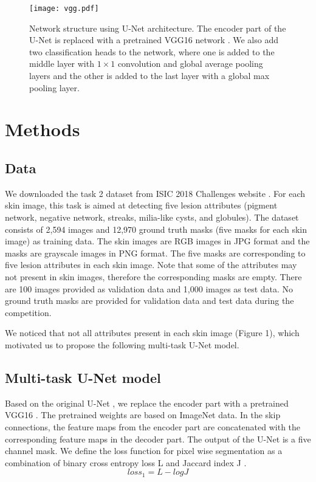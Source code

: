 \documentclass{article}
\begin{document}
\begin{figure}[!ht]
\begin{center}
\texttt{[image: vgg.pdf]}
\end{center}
   \caption{Network structure using U-Net architecture. The encoder part of the U-Net is replaced with a pretrained VGG16 network \cite{shvets2018automatic}. We also add two classification heads to the network, where one is added to the middle layer with $1\times1$ convolution and global average pooling layers and the other is added to the last layer with a global max pooling layer.}
\label{fig:short}
\end{figure}


\section{Methods}


\subsection{Data}
We downloaded the task 2 dataset from ISIC 2018 Challenges website \cite{Tschandl2018_HAM10000}. For each skin image, this task is aimed at detecting five lesion attributes (pigment network, negative network, streaks, milia-like cysts, and globules). The dataset consists of 2,594 images and 12,970 ground truth masks (five masks for each skin image) as training data. The skin images are RGB images in JPG format and the masks are grayscale images in PNG format. The five masks are corresponding to five lesion attributes in each skin image. Note that some of the attributes may not present in skin images, therefore the corresponding masks are empty. There are 100 images provided as validation data and 1,000 images as test data.  No ground truth masks are provided for validation data and test data during the competition. 

We noticed that not all attributes present in each skin image (Figure 1), which motivated us to propose the following multi-task U-Net model.

\subsection{Multi-task U-Net model}
Based on the original U-Net \cite{ronneberger2015u}, we replace the encoder part with a pretrained VGG16 \cite{iglovikov2018ternausnetv2}. The pretrained weights are based on ImageNet data. In the skip connections, the feature maps from the encoder part are concatenated with the corresponding feature maps in the decoder part. The output of the U-Net is a five channel mask. We define the loss function for pixel wise segmentation as a combination of binary cross entropy loss L and Jaccard index J \cite{shvets2018automatic}. 
\begin{equation}
loss_1 = L - log J
\end{equation}
\end{document}
